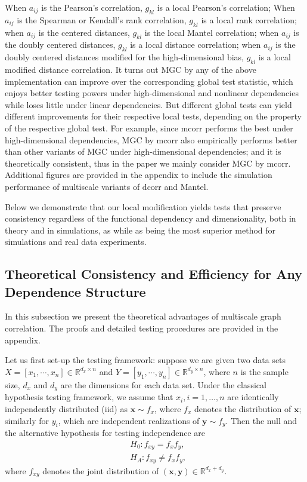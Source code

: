 \documentclass[11pt]{article}
\providecommand{\mb}[1]{\boldsymbol{#1}}
\newcommand{\Real}{\mathbb{R}}
\begin{document}
When $a_{ij}$ is the Pearson's correlation, $g_{kl}$ is a local Pearson's correlation;
When $a_{ij}$ is the Spearman or Kendall's rank correlation, $g_{kl}$ is a local rank correlation;
when $a_{ij}$ is the centered distances, $g_{kl}$ is the local Mantel correlation;
when $a_{ij}$ is the doubly centered distances, $g_{kl}$ is a local distance correlation;
when $a_{ij}$ is the doubly centered distances modified for the high-dimensional bias, $g_{kl}$ is a local modified distance correlation.  
It turns out MGC by any of the above implementation can improve over the corresponding global test statistic, which enjoys better testing powers under high-dimensional and nonlinear dependencies while loses little under linear dependencies. But different global tests can yield different improvements for their respective local tests, depending on the property of the respective global test. For example, since mcorr performs the best under high-dimensional dependencies, MGC by mcorr also empirically performs better than other variants of MGC under high-dimensional dependencies; and it is theoretically consistent, thus in the paper we mainly consider MGC by mcorr. Additional figures are provided in the appendix to include the simulation performance of multiscale variants of dcorr and Mantel. 

Below we demonstrate that our local modification yields tests that preserve consistency regardless of the functional dependency and dimensionality, both in theory and in simulations, as while as being the most superior method for simulations and real data experiments.


\subsection{Theoretical Consistency and Efficiency for Any Dependence Structure}
\label{main4}
In this subsection we present the theoretical advantages of multiscale graph correlation. The proofs and detailed testing procedures are provided in the appendix. 

Let us first set-up the testing framework: suppose we are given two data sets $X=[x_{1},\cdots, x_{n}] \in \Real^{d_{x} \times n}$ and $Y=[y_{1},\cdots, y_{n}] \in \Real^{d_{y} \times n}$, where $n$ is the sample size, $d_{x}$ and $d_{y}$ are the dimensions for each data set. Under the classical hypothesis testing framework, we assume that $x_{i}, i=1,\ldots,n$ are identically independently distributed (iid) as $\mb{x} \sim f_{x}$, where $f_{x}$ denotes the distribution of $\mb{x}$; similarly for $y_{i}$, which are independent realizations of $\mb{y} \sim f_{y}$. Then the null and the alternative hypothesis for testing independence are
\begin{align*}
& H_{0}: f_{xy}=f_{x}f_{y},\\
& H_{A}: f_{xy} \neq f_{x}f_{y},
\end{align*}
where $f_{xy}$ denotes the joint distribution of $(\mb{x},\mb{y}) \in \Real^{d_{x} + d_{y}}$. 
\end{document}
